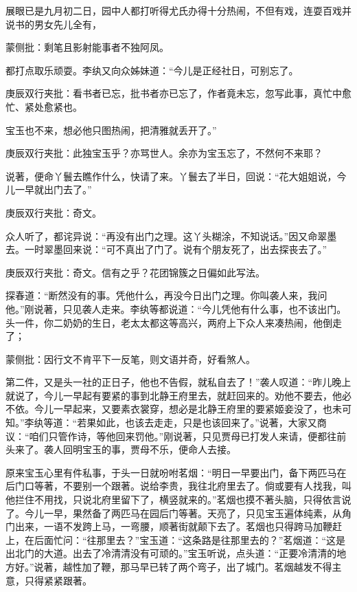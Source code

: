 \begin{parag}


    展眼已是九月初二日，园中人都打听得尤氏办得十分热闹，不但有戏，连耍百戏并说书的男女先儿全有，\begin{note}蒙侧批：剩笔且影射能事者不独阿凤。\end{note}都打点取乐顽耍。李纨又向众姊妹道：“今儿是正经社日，可别忘了。\begin{note}庚辰双行夹批：看书者已忘，批书者亦已忘了，作者竟未忘，忽写此事，真忙中愈忙、紧处愈紧也。\end{note}宝玉也不来，想必他只图热闹，把清雅就丢开了。”\begin{note}庚辰双行夹批：此独宝玉乎？亦骂世人。余亦为宝玉忘了，不然何不来耶？\end{note}说著，便命丫鬟去瞧作什么，快请了来。丫鬟去了半日，回说：“花大姐姐说，今儿一早就出门去了。”\begin{note}庚辰双行夹批：奇文。\end{note}众人听了，都诧异说：“再没有出门之理。这丫头糊涂，不知说话。”因又命翠墨去。一时翠墨回来说：“可不真出了门了。说有个朋友死了，出去探丧去了。”\begin{note}庚辰双行夹批：奇文。信有之乎？花团锦簇之日偏如此写法。\end{note}探春道：“断然没有的事。凭他什么，再没今日出门之理。你叫袭人来，我问他。”刚说著，只见袭人走来。李纨等都说道：“今儿凭他有什么事，也不该出门。头一件，你二奶奶的生日，老太太都这等高兴，两府上下众人来凑热闹，他倒走了；\begin{note}蒙侧批：因行文不肯平下一反笔，则文语并奇，好看煞人。\end{note}第二件，又是头一社的正日子，他也不告假，就私自去了！”袭人叹道：“昨儿晚上就说了，今儿一早起有要紧的事到北静王府里去，就赶回来的。劝他不要去，他必不依。今儿一早起来，又要素衣裳穿，想必是北静王府里的要紧姬妾没了，也未可知。”李纨等道：“若果如此，也该去走走，只是也该回来了。”说著，大家又商议：“咱们只管作诗，等他回来罚他。”刚说著，只见贾母已打发人来请，便都往前头来了。袭人回明宝玉的事，贾母不乐，便命人去接。
\end{parag}


\begin{parag}


    原来宝玉心里有件私事，于头一日就吩咐茗烟：“明日一早要出门，备下两匹马在后门口等著，不要别一个跟著。说给李贵，我往北府里去了。倘或要有人找我，叫他拦住不用找，只说北府里留下了，横竖就来的。”茗烟也摸不著头脑，只得依言说了。今儿一早，果然备了两匹马在园后门等著。天亮了，只见宝玉遍体纯素，从角门出来，一语不发跨上马，一弯腰，顺著街就颠下去了。茗烟也只得跨马加鞭赶上，在后面忙问：“往那里去？”宝玉道：“这条路是往那里去的？”茗烟道：“这是出北门的大道。出去了冷清清没有可顽的。”宝玉听说，点头道：“正要冷清清的地方好。”说著，越性加了鞭，那马早已转了两个弯子，出了城门。茗烟越发不得主意，只得紧紧跟著。
\end{parag}


